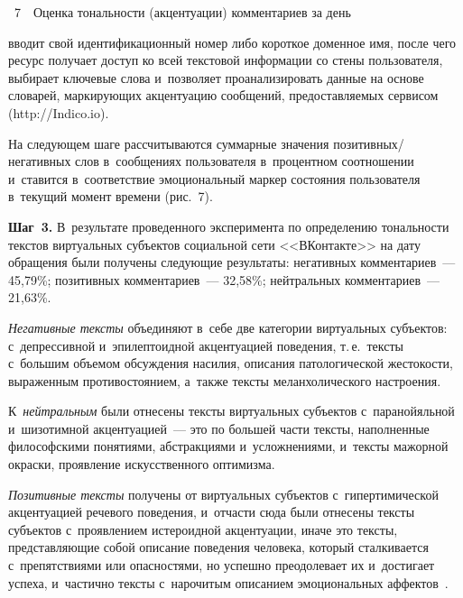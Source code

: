 \begin{multicols}{2}
{\begin{center}
\end{center}

\vspace*{3pt}

\noindent
{{\figurename~7}\ \ \small{Оценка тональности (акцентуации) комментариев за день}}

}


\addtocounter{figure}{1}



\noindent
 вводит 
свой идентификационный номер либо короткое доменное имя, после чего 
ресурс получает доступ ко всей текстовой информации со стены пользователя, 
выбирает ключевые слова и~позволяет проанализировать данные на основе 
словарей, маркирующих акцентуацию сообщений, предо\-став\-ля\-емых сервисом 
({\sf http://Indico.io}). 

На следующем шаге рассчитываются суммарные 
значения по\-зи\-тив\-ных/не\-га\-тив\-ных слов в~сообщениях пользователя 
в~процентном соотношении и~ставится в~соответствие эмоциональный маркер 
состояния пользователя в~текущий момент времени (рис.~7).

\bigskip
  
  \noindent
  \textbf{Шаг~3.} В~результате проведенного эксперимента по определению 
тональности текстов виртуальных субъектов социальной сети <<ВКонтакте>> 
на дату обращения были получены следующие результаты: негативных 
комментариев~--- 45,79\%; позитивных комментариев~--- 32,58\%; нейтральных 
комментариев~--- 21,63\%. 
  
  
  \textit{Негативные тексты} объединяют в~себе две категории виртуальных 
субъектов: с~депрессивной и~эпилептоидной акцентуацией поведения, т.\,е.\ 
текс\-ты с~большим объемом обсуждения насилия, описания патологической 
жестокости, выраженным противостоянием, а~так\-же текс\-ты меланхолического 
настроения. 

К~\textit{нейтральным} были отнесены текс\-ты виртуальных 
субъектов с~паранойяльной и~шизотимной акцентуацией~--- это по большей 
час\-ти текс\-ты, наполненные философскими понятиями, абстракциями 
и~услож\-не\-ни\-ями, и~текс\-ты мажорной окраски, проявление искусственного 
оптимизма. 

\textit{Позитивные тексты} получены от виртуальных субъектов 
с~гипертимической акцентуацией речевого поведения, и~отчасти сюда были 
отнесены текс\-ты субъектов с~проявлением истероидной акцентуации, иначе это 
текс\-ты, представляющие собой описание поведения человека, который 
сталкивается с~препятствиями или опасностями, но успешно преодолевает их 
и~достигает успеха, и~час\-тич\-но текс\-ты с~нарочитым описанием эмоциональных 
аффектов~\cite{13-sig}.
  

\end{multicols}
